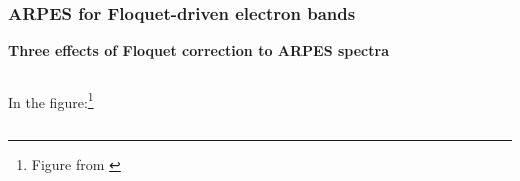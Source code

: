 \documentclass[t]{beamer}
\begin{document}
\begin{frame}
\frametitle{ARPES for Floquet-driven electron bands}

\textbf{Three effects of Floquet correction to ARPES spectra}

\begin{columns}

\begin{column}{0.3\textwidth}
    \begin{minipage}{\columnwidth}
        In the figure:\footnote{
            Figure from \cite{zhou2023pseudospin}
        }
        \begin{itemize}
        \end{itemize}
    \end{minipage}
\end{column}

\begin{column}{0.7\textwidth}
    \begin{minipage}{\columnwidth}
        \begin{center}
            \begin{tikzpicture}[x=0.75pt,y=0.75pt,yscale=-1,xscale=1]
                

\end{tikzpicture}
\end{center}
\end{minipage}
\end{column}
\end{columns}
\end{frame}
\end{document}
